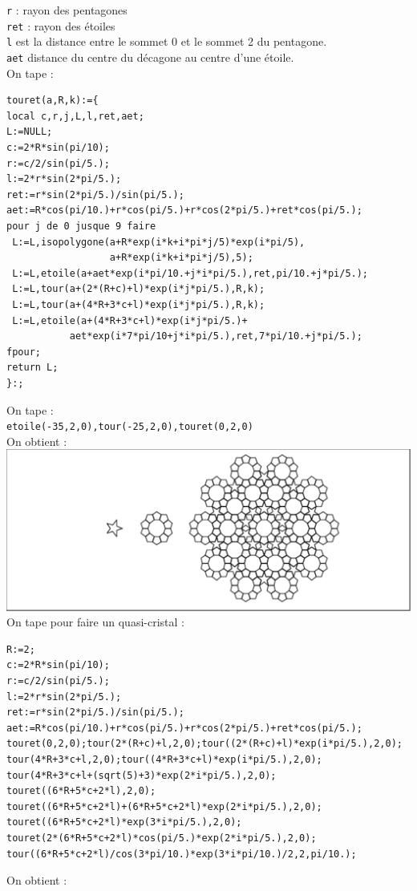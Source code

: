 \documentclass[a4paper,11pt]{book}
\begin{document}
{\tt r} : rayon des pentagones\\
{\tt ret} : rayon des \'etoiles\\
{\tt l} est la distance entre le sommet 0 et le sommet 2 du pentagone.\\
{\tt aet} distance du centre du d\'ecagone au centre d'une \'etoile.\\
On tape : 
\begin{verbatim}
touret(a,R,k):={
local c,r,j,L,l,ret,aet;
L:=NULL;
c:=2*R*sin(pi/10);
r:=c/2/sin(pi/5.);
l:=2*r*sin(2*pi/5.);
ret:=r*sin(2*pi/5.)/sin(pi/5.);
aet:=R*cos(pi/10.)+r*cos(pi/5.)+r*cos(2*pi/5.)+ret*cos(pi/5.);
pour j de 0 jusque 9 faire
 L:=L,isopolygone(a+R*exp(i*k+i*pi*j/5)*exp(i*pi/5),
                  a+R*exp(i*k+i*pi*j/5),5);
 L:=L,etoile(a+aet*exp(i*pi/10.+j*i*pi/5.),ret,pi/10.+j*pi/5.);
 L:=L,tour(a+(2*(R+c)+l)*exp(i*j*pi/5.),R,k);
 L:=L,tour(a+(4*R+3*c+l)*exp(i*j*pi/5.),R,k);
 L:=L,etoile(a+(4*R+3*c+l)*exp(i*j*pi/5.)+
           aet*exp(i*7*pi/10+j*i*pi/5.),ret,7*pi/10.+j*pi/5.);
fpour;
return L;
}:;
\end{verbatim}
On tape :\\
{\tt etoile(-35,2,0),tour(-25,2,0),touret(0,2,0)}\\
On obtient :\\

\includegraphics[width=\textwidth]{quasicristal0}\\

On tape pour faire un quasi-cristal :
\begin{verbatim}
R:=2;
c:=2*R*sin(pi/10);
r:=c/2/sin(pi/5.);
l:=2*r*sin(2*pi/5.);
ret:=r*sin(2*pi/5.)/sin(pi/5.);
aet:=R*cos(pi/10.)+r*cos(pi/5.)+r*cos(2*pi/5.)+ret*cos(pi/5.);
touret(0,2,0);tour(2*(R+c)+l,2,0);tour((2*(R+c)+l)*exp(i*pi/5.),2,0);
tour(4*R+3*c+l,2,0);tour((4*R+3*c+l)*exp(i*pi/5.),2,0);
tour(4*R+3*c+l+(sqrt(5)+3)*exp(2*i*pi/5.),2,0);
touret((6*R+5*c+2*l),2,0);
touret((6*R+5*c+2*l)+(6*R+5*c+2*l)*exp(2*i*pi/5.),2,0);
touret((6*R+5*c+2*l)*exp(3*i*pi/5.),2,0);
touret(2*(6*R+5*c+2*l)*cos(pi/5.)*exp(2*i*pi/5.),2,0);
tour((6*R+5*c+2*l)/cos(3*pi/10.)*exp(3*i*pi/10.)/2,2,pi/10.);
\end{verbatim}
On obtient :\\
\end{document}

